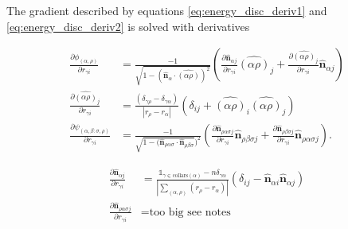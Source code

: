 \documentclass[draft]{article}
\begin{document}
The gradient described by equations \ref{eq:energy_disc_deriv1} and \ref{eq:energy_disc_deriv2} is solved with derivatives

\begin{align*}
    \frac{\partial \phi_{(\alpha,\rho)}}{\partial r_{\gamma i}} &= \frac{-1}{\sqrt{1 - (\hat{\bm{n}}_\alpha \cdot \hat{(\alpha\rho)})^2}} \left(\frac{\partial \hat{\bm{n}}_{\alpha j}}{\partial r_{\gamma i}} \hat{(\alpha\rho)}_j + \frac{\partial \hat{(\alpha\rho)}_j}{\partial r_{\gamma i}} \hat{\bm{n}}_{\alpha j} \right) \\
    \frac{\partial \hat{(\alpha\rho)}_j}{\partial r_{\gamma i}} &= \frac{(\delta_{\gamma\rho} - \delta_{\gamma\alpha})}{|r_\rho - r_\alpha|} \left( \delta_{ij} + \hat{(\alpha\rho)}_i\hat{(\alpha\rho)}_j \right) \\
    \frac{\partial \psi_{(\alpha, \beta: \sigma, \rho)}}{\partial r_{\gamma i}} &= \frac{-1}{\sqrt{1 - (\hat{\bm{n}}_{\rho\alpha\sigma} \cdot \hat{\bm{n}}_{\rho\beta\sigma}})^2} \left(\frac{\partial \hat{\bm{n}}_{\rho\alpha\sigma j}}{\partial r_{\gamma i}} \hat{\bm{n}}_{\rho\beta\sigma j} + \frac{\partial \hat{\bm{n}}_{\rho\beta\sigma j}}{\partial r_{\gamma i}} \hat{\bm{n}}_{\rho\alpha\sigma j} \right). 
\end{align*}



\begin{align*}	
    \frac{\partial \hat{\bm{n}}_{\alpha j}}{\partial r_{\gamma i}} &= \frac{\mathbb{1}_{\gamma\in \text{collars}(\alpha)} - n\delta_{\gamma\alpha}}{\left| \sum_{(\alpha, \rho)} (r_\rho - r_\alpha) \right|} \left(\delta_{ij} - \hat{\bm{n}}_{\alpha i} \hat{\bm{n}}_{\alpha j} \right) \\
    \frac{\partial \hat{\bm{n}}_{\rho\alpha\sigma j}}{\partial r_{\gamma i}} &= \text{too big see notes}
\end{align*}
\end{document}
